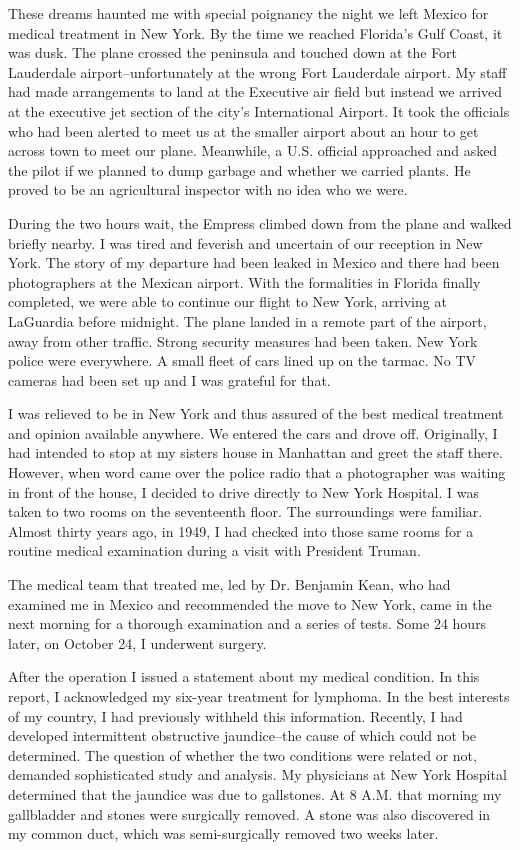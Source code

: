 These dreams haunted me with special poignancy the night we left Mexico for medical treatment in New York. By the time we reached Florida's Gulf Coast, it was dusk. The plane crossed the peninsula and touched down at the Fort Lauderdale airport--unfortunately at the wrong Fort Lauderdale airport. My staff had made arrangements to land at the Executive air field but instead we arrived at the executive jet section of the city’s International Airport. It took the officials who had been alerted to meet us at the smaller airport about an hour to get across town to meet our plane. Meanwhile, a U.S. official approached and asked the pilot if we planned to dump garbage and whether we carried plants. He proved to be an agricultural inspector with no idea who we were. 

During the two hours wait, the Empress climbed down from the plane and walked briefly nearby. I was tired and feverish and uncertain of our reception in New York. The story of my departure had been leaked in Mexico and there had been photographers at the Mexican airport. With the formalities in Florida finally completed, we were able to continue our flight to New York, arriving at LaGuardia before midnight. The plane landed in a remote part of the airport, away from other traffic. Strong security measures had been taken. New York police were everywhere. A small fleet of cars lined up on the tarmac. No TV cameras had been set up and I was grateful for that. 

I was relieved to be in New York and thus assured of the best medical treatment and opinion available anywhere. We entered the cars and drove off. Originally, I had intended to stop at my sisters house in Manhattan and greet the staff there. However, when word came over the police radio that a photographer was waiting in front of the house, I decided to drive directly to New York Hospital. I was taken to two rooms on the seventeenth floor. The surroundings were familiar. Almost thirty years ago, in 1949, I had checked into those same rooms for a routine medical examination during a visit with President Truman. 

The medical team that treated me, led by Dr. Benjamin Kean, who had examined me in Mexico and recommended the move to New York, came in the next morning for a thorough examination and a series of tests. Some 24 hours later, on October 24, I underwent surgery. 

After the operation I issued a statement about my medical condition. In this report, I acknowledged my six-year treatment for lymphoma. In the best interests of my country, I had previously withheld this information. Recently, I had developed intermittent obstructive jaundice--the cause of which could not be determined. The question of whether the two conditions were related or not, demanded sophisticated study and analysis. My physicians at New York Hospital determined that the jaundice was due to gallstones. At 8 A.M. that morning my gallbladder and stones were surgically removed. A stone was also discovered in my common duct, which was semi-surgically removed two weeks later. 

